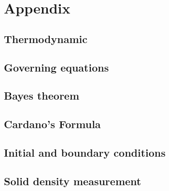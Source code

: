 \documentclass[a4paper,fleqn]{cas-dc}
\begin{document}
\clearpage \appendix \label{appendix}
\section{Appendix} 
\subsection{Thermodynamic}

\subsection{Governing equations}


\subsection{Bayes theorem} \label{CH: Bayes}


\subsection{Cardano's Formula} \label{CH: Cardano}


\subsection{Initial and boundary conditions} \label{CH: IC_BC}


\subsection{Solid density measurement} \label{CH: Solid_Density_Measurment}
\end{document}

